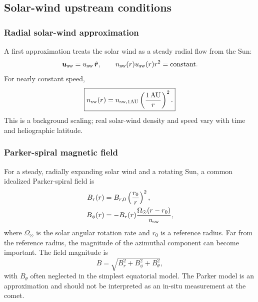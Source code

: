 \documentclass[11pt,a4paper]{article}
\newcommand{\uvec}{\boldsymbol{u}}
\begin{document}
\subsection{Solar-wind upstream conditions}
\subsubsection{Radial solar-wind approximation}
A first approximation treats the solar wind as a steady radial flow from the Sun:
\begin{equation}
\uvec_{\rm sw}=u_{\rm sw}\,\hat{\boldsymbol r},\qquad
n_{\rm sw}(r)u_{\rm sw}(r)r^2=\mathrm{constant}.
\end{equation}
For nearly constant speed,
\begin{equation}
\boxed{n_{\rm sw}(r)=n_{\rm sw,1AU}\left(\frac{1\,\mathrm{AU}}{r}\right)^2.}
\label{eq:sw-density}
\end{equation}
This is a background scaling; real solar-wind density and speed vary with time and heliographic latitude.

\subsubsection{Parker-spiral magnetic field}
For a steady, radially expanding solar wind and a rotating Sun, a common idealized Parker-spiral field is
\begin{align}
B_r(r)&=B_{r,0}\left(\frac{r_0}{r}\right)^2,\\
B_\phi(r)&=-B_r(r)\frac{\Omega_\odot(r-r_0)}{u_{\rm sw}},
\label{eq:parker-components}
\end{align}
where $\Omega_\odot$ is the solar angular rotation rate and $r_0$ is a reference radius. Far from the reference radius, the magnitude of the azimuthal component can become important. The field magnitude is
\begin{equation}
B=\sqrt{B_r^2+B_\phi^2+B_\theta^2},
\end{equation}
with $B_\theta$ often neglected in the simplest equatorial model. The Parker model is an approximation and should not be interpreted as an in-situ measurement at the comet.
\end{document}
